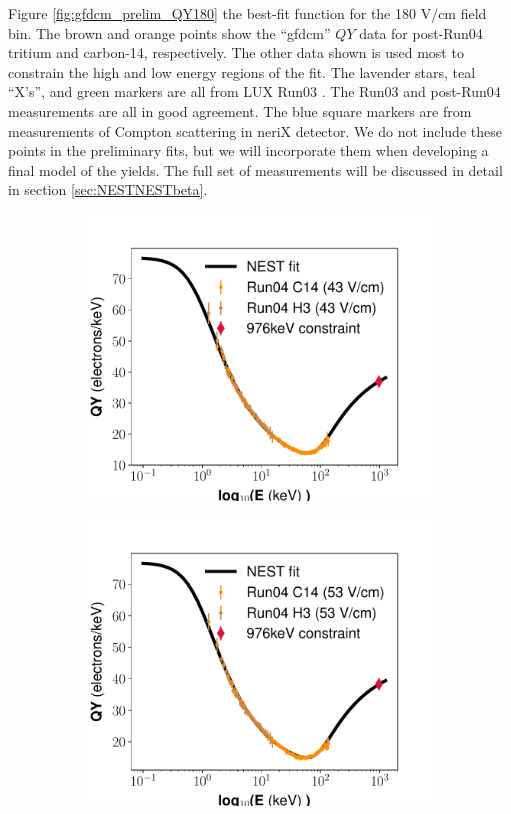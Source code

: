 Figure \ref{fig:gfdcm_prelim_QY180} the best-fit function for the 180 V/cm field bin. The brown and orange points show the ``gfdcm'' $QY$ data for post-Run04 tritium and carbon-14, respectively. The other data shown is used most to constrain the high and low energy regions of the fit. The lavender stars, teal ``X's'', and green markers are all from LUX Run03 \cite{lux_tritium, DQyields, Evanyields}. The Run03 and post-Run04 measurements are all in good agreement. The blue square markers are from measurements of Compton scattering in neriX detector\cite{nerix}. We do not include these points in the preliminary fits, but we will incorporate them when developing a final model of the yields. The full set of measurements will be discussed in detail in section \ref{sec:NESTNESTbeta}.
\begin{figure}[h!]
\centering
\begin{subfigure}{0.5\textwidth}
  \centering
  \includegraphics[width=\textwidth]{Figures/Yields_fit_old/NEST_fit_43Vcm_old.pdf}
  \caption{}
\end{subfigure}%
\begin{subfigure}{0.5\textwidth}
  \centering
  \includegraphics[width=\textwidth]{Figures/Yields_fit_old/NEST_fit_53Vcm_old.pdf}

\end{subfigure}
\end{figure}
